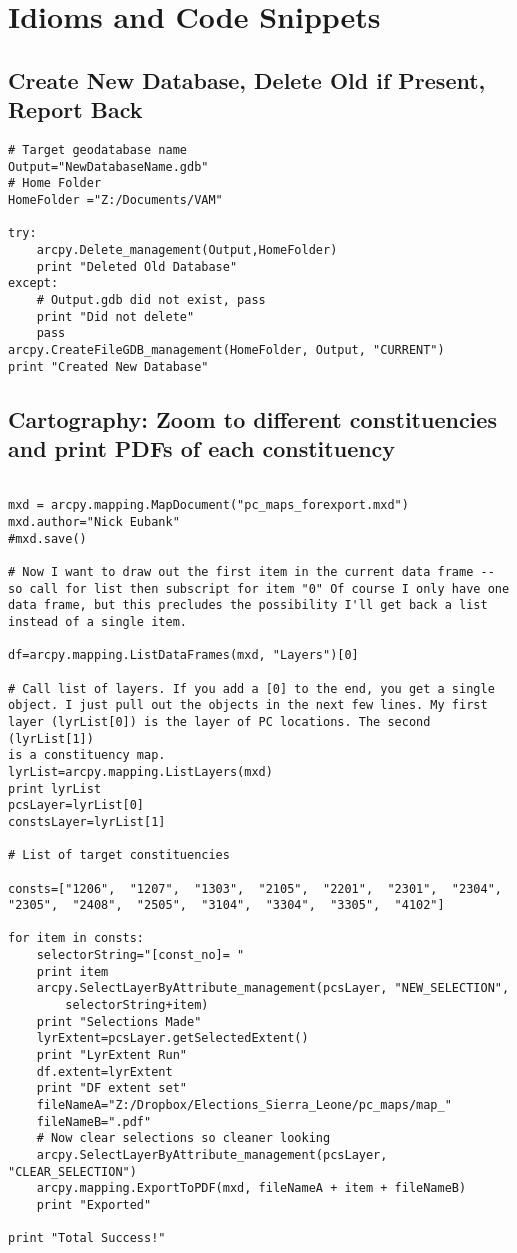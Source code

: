 \documentclass[12pt]{article}
\begin{document}
\section*{Idioms and Code Snippets}
\subsection*{Create New Database, Delete Old if Present, Report Back}
\begin{verbatim}
# Target geodatabase name
Output="NewDatabaseName.gdb"
# Home Folder
HomeFolder ="Z:/Documents/VAM"

try:
    arcpy.Delete_management(Output,HomeFolder)
    print "Deleted Old Database"
except:
    # Output.gdb did not exist, pass
    print "Did not delete"
    pass
arcpy.CreateFileGDB_management(HomeFolder, Output, "CURRENT")
print "Created New Database"	
\end{verbatim}
\pagebreak
\subsection*{Cartography: Zoom to different constituencies and print PDFs of each constituency}
\begin{verbatim}

mxd = arcpy.mapping.MapDocument("pc_maps_forexport.mxd")
mxd.author="Nick Eubank"
#mxd.save()

# Now I want to draw out the first item in the current data frame -- 
so call for list then subscript for item "0" Of course I only have one 
data frame, but this precludes the possibility I'll get back a list 
instead of a single item.

df=arcpy.mapping.ListDataFrames(mxd, "Layers")[0]

# Call list of layers. If you add a [0] to the end, you get a single 
object. I just pull out the objects in the next few lines. My first 
layer (lyrList[0]) is the layer of PC locations. The second (lyrList[1]) 
is a constituency map.
lyrList=arcpy.mapping.ListLayers(mxd)
print lyrList
pcsLayer=lyrList[0]
constsLayer=lyrList[1]

# List of target constituencies

consts=["1206",  "1207",  "1303",  "2105",  "2201",  "2301",  "2304",  
"2305",  "2408",  "2505",  "3104",  "3304",  "3305",  "4102"]

for item in consts:
    selectorString="[const_no]= "
    print item
    arcpy.SelectLayerByAttribute_management(pcsLayer, "NEW_SELECTION", 
		selectorString+item)
    print "Selections Made"
    lyrExtent=pcsLayer.getSelectedExtent()
    print "LyrExtent Run"
    df.extent=lyrExtent
    print "DF extent set"
    fileNameA="Z:/Dropbox/Elections_Sierra_Leone/pc_maps/map_"
    fileNameB=".pdf"
    # Now clear selections so cleaner looking
    arcpy.SelectLayerByAttribute_management(pcsLayer, "CLEAR_SELECTION")
    arcpy.mapping.ExportToPDF(mxd, fileNameA + item + fileNameB)
    print "Exported"

print "Total Success!"

\end{verbatim}
\end{document}
